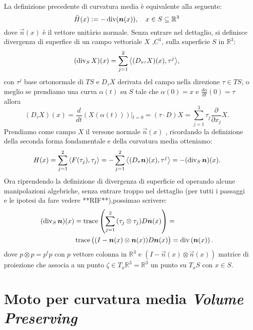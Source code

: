 \begin{osservazione}
La definizione precedente di curvatura media è equivalente alla seguente:
\begin{equation}
  \label{eq:cp-114}
  \tilde{H}(x):= -\operatorname{div}(\bm{n}(x)), \quad x\in S\subseteq\mathbb{R}^3
\end{equation}
dove $\vec{n}(x)$ è il vettore unitàrio normale. Senza entrare nel dettaglio, si definisce divergenza di superfice di un campo vettoriale $X$ ,$C^1$, sulla superficie $S$ in $\mathbb{R}^3$:
\[
(\operatorname{div}_{S}X)(x) = \sum_{j=1}^{2}{\left<(D_{\tau^j} X)(x),\tau^j\right>},
\]
con $\tau^j$ base ortonormale di $TS$ e $D_\tau X$ derivata del campo nella direzione $\tau\in TS$, o meglio se prendiamo una curva $\alpha(t)$ su $S$ tale che $\alpha(0) = x$ e $\frac{d\alpha}{dt}(0)=\tau$ allora
\[
(D_\tau X)(x)=\frac{d}{dt}\left(X(\alpha(t))\right)\left|_{t=0}\right. =(\tau\cdot D)X=\sum_{j=1}^3\tau_j\frac{\partial}{\partial x_j}X.
\]
Prendiamo come campo $X$ il versone normale $\vec{n}(x)$ , ricordando la definizione della seconda forma fondamentale e della curvatura media otteniamo:
\[
H(x)= \sum_{j=1}^{2}{\left<F(\tau_j),\tau_j\right>} = -\sum_{j=1}^{2}{\left<(D_\tau \bm{n})(x),\tau^j\right>}=-(\operatorname{div}_{S}\bm{n})(x).
\]
Ora riprendendo la definizione di divergenza di superficie ed operando alcune manipolazioni algebriche, senza entrare troppo nel dettaglio (per tutti i passaggi e le ipotesi da fare vedere **RIF**),possimao scrivere:
\[
\begin{aligned}
(\operatorname{div}_{S}\bm{n})(x) &= \operatorname{trace}\left(\sum_{j=1}^2{(\tau_j\otimes\tau_j)}D\bm{n}(x)\right)=\\
&\operatorname{trace}\big((I-\bm{n}(x)\otimes\bm{n}(x))D\bm{n}(x)\big)=\operatorname{div}\left(\bm{n}(x)\right).
\end{aligned}
\]
dove $p\otimes p=p^tp$ con $p$ vettore colonna in $\mathbb{R}^3$ e $(I-\vec{n}(x)\otimes\vec{n}(x))$ matrice di proiezione che associa a un punto $\zeta \in T_x\mathbb{R}^3=\mathbb{R}^3$ un punto su $T_xS$ con $x\in S$.
\end{osservazione}
%
%
\section{Moto per curvatura media \emph{Volume Preserving}}

